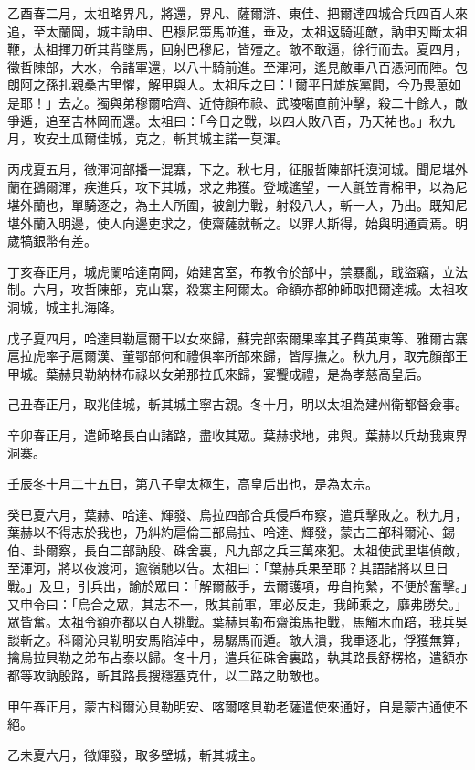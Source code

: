 \begin{pinyinscope}
乙酉春二月，太祖略界凡，將還，界凡、薩爾滸、東佳、把爾達四城合兵四百人來追，至太蘭岡，城主訥申、巴穆尼策馬並進，垂及，太祖返騎迎敵，訥申刃斷太祖鞭，太祖揮刀斫其背墜馬，回射巴穆尼，皆殪之。敵不敢逼，徐行而去。夏四月，徵哲陳部，大水，令諸軍還，以八十騎前進。至渾河，遙見敵軍八百憑河而陣。包朗阿之孫扎親桑古里懼，解甲與人。太祖斥之曰：「爾平日雄族黨間，今乃畏葸如是耶！」去之。獨與弟穆爾哈齊、近侍顏布祿、武陵噶直前沖擊，殺二十餘人，敵爭遁，追至吉林岡而還。太祖曰：「今日之戰，以四人敗八百，乃天祐也。」秋九月，攻安土瓜爾佳城，克之，斬其城主諾一莫渾。

丙戌夏五月，徵渾河部播一混寨，下之。秋七月，征服哲陳部托漠河城。聞尼堪外蘭在鵝爾渾，疾進兵，攻下其城，求之弗獲。登城遙望，一人氈笠青棉甲，以為尼堪外蘭也，單騎逐之，為土人所圍，被創力戰，射殺八人，斬一人，乃出。既知尼堪外蘭入明邊，使人向邊吏求之，使齋薩就斬之。以罪人斯得，始與明通貢焉。明歲犒銀幣有差。

丁亥春正月，城虎闌哈達南岡，始建宮室，布教令於部中，禁暴亂，戢盜竊，立法制。六月，攻哲陳部，克山寨，殺寨主阿爾太。命額亦都帥師取把爾達城。太祖攻洞城，城主扎海降。

戊子夏四月，哈達貝勒扈爾干以女來歸，蘇完部索爾果率其子費英東等、雅爾古寨扈拉虎率子扈爾漢、董鄂部何和禮俱率所部來歸，皆厚撫之。秋九月，取完顏部王甲城。葉赫貝勒納林布祿以女弟那拉氏來歸，宴饗成禮，是為孝慈高皇后。

己丑春正月，取兆佳城，斬其城主寧古親。冬十月，明以太祖為建州衛都督僉事。

辛卯春正月，遣師略長白山諸路，盡收其眾。葉赫求地，弗與。葉赫以兵劫我東界洞寨。

壬辰冬十月二十五日，第八子皇太極生，高皇后出也，是為太宗。

癸巳夏六月，葉赫、哈達、輝發、烏拉四部合兵侵戶布察，遣兵擊敗之。秋九月，葉赫以不得志於我也，乃糾約扈倫三部烏拉、哈達、輝發，蒙古三部科爾沁、錫伯、卦爾察，長白二部訥殷、硃舍裏，凡九部之兵三萬來犯。太祖使武里堪偵敵，至渾河，將以夜渡河，逾嶺馳以告。太祖曰：「葉赫兵果至耶？其語諸將以旦日戰。」及旦，引兵出，諭於眾曰：「解爾蔽手，去爾護項，毋自拘縶，不便於奮擊。」又申令曰：「烏合之眾，其志不一，敗其前軍，軍必反走，我師乘之，靡弗勝矣。」眾皆奮。太祖令額亦都以百人挑戰。葉赫貝勒布齋策馬拒戰，馬觸木而踣，我兵吳談斬之。科爾沁貝勒明安馬陷淖中，易驏馬而遁。敵大潰，我軍逐北，俘獲無算，擒烏拉貝勒之弟布占泰以歸。冬十月，遣兵征硃舍裏路，執其路長舒楞格，遣額亦都等攻訥殷路，斬其路長搜穩塞克什，以二路之助敵也。

甲午春正月，蒙古科爾沁貝勒明安、喀爾喀貝勒老薩遣使來通好，自是蒙古通使不絕。

乙未夏六月，徵輝發，取多壁城，斬其城主。


\end{pinyinscope}
